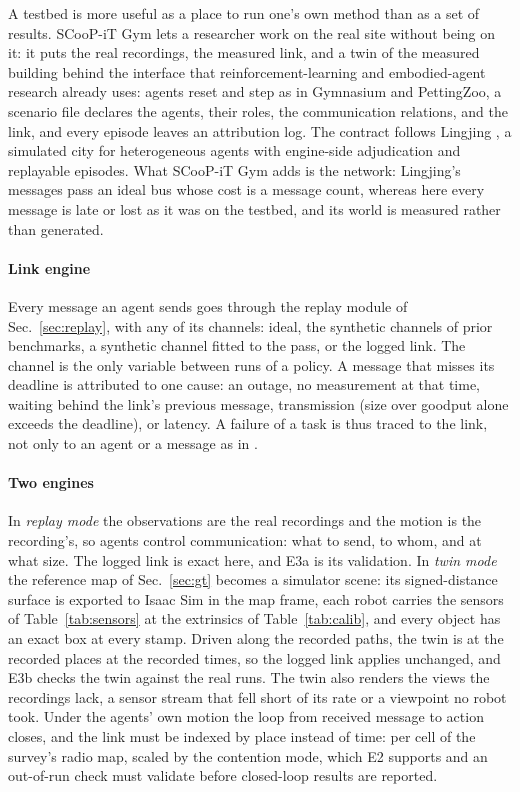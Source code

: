 A testbed is more useful as a place to run one's own method than as a
set of results. SCooP-iT Gym lets a researcher work on the real site
without being on it: it puts the real recordings, the measured link,
and a twin of the measured building behind the interface that reinforcement-learning and
embodied-agent research already uses: agents reset and step as in
Gymnasium and PettingZoo, a scenario file declares the agents, their
roles, the communication relations, and the link, and every episode
leaves an attribution log. The contract follows Lingjing
\cite{lingjing}, a simulated city for heterogeneous agents with engine-side
adjudication and replayable episodes. What SCooP-iT Gym adds is the
network: Lingjing's messages pass an ideal bus whose cost is a message
count, whereas here every message is late or lost as it was on the
testbed, and its world is measured rather than generated.

\paragraph{Link engine} Every message an agent sends goes through the
replay module of Sec.~\ref{sec:replay}, with any of its channels: ideal,
the synthetic channels of prior benchmarks, a synthetic channel fitted to
the pass, or the logged link. The channel is the only variable between
runs of a policy. A message that misses its deadline is attributed to
one cause: an outage, no measurement at that time, waiting behind the
link's previous message, transmission (size over goodput alone exceeds
the deadline), or latency. A failure of a task is thus traced to the
link, not only to an agent or a message as in \cite{lingjing}.

\paragraph{Two engines} In \emph{replay mode} the observations are the
real recordings and the motion is the recording's, so agents control
communication: what to send, to whom, and at what size. The logged link
is exact here, and E3a is its validation. In \emph{twin mode} the
reference map of Sec.~\ref{sec:gt} becomes a simulator scene: its
signed-distance surface is exported to Isaac Sim \cite{isaacsim} in the
map frame, each robot carries the sensors of Table~\ref{tab:sensors} at
the extrinsics of Table~\ref{tab:calib}, and every object has an exact
box at every stamp. Driven along the recorded paths, the twin is at the
recorded places at the recorded times, so the logged link applies
unchanged, and E3b checks the twin against the real runs. The twin also
renders the views the recordings lack, a sensor stream that fell short of
its rate or a viewpoint no robot took. Under the agents' own motion
the loop from received message to action closes, and the link must be
indexed by place instead of time: per cell of the survey's radio map,
scaled by the contention mode, which E2 supports and an out-of-run check
must validate before closed-loop results are reported.

